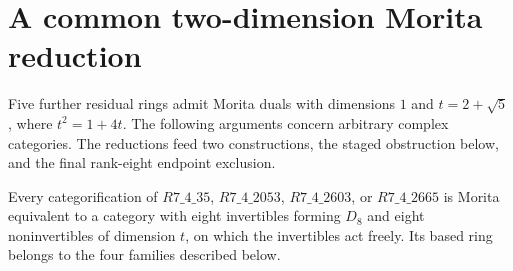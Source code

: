 \section{A common two-dimension Morita reduction}

Five further residual rings admit Morita duals with dimensions
$1$ and $t=2+\sqrt5$, where $t^2=1+4t$. The following arguments
concern arbitrary complex categories. The reductions feed two constructions,
the staged obstruction below, and the final rank-eight endpoint exclusion.

\begin{proposition}\label{prop:four-dihedral}
Every categorification of $R7\_4\_35$, $R7\_4\_2053$,
$R7\_4\_2603$, or $R7\_4\_2665$ is Morita equivalent to a
category with eight invertibles forming $D_8$ and eight noninvertibles
of dimension $t$, on which the invertibles act freely. Its based ring
belongs to the four families described below.
\end{proposition}
